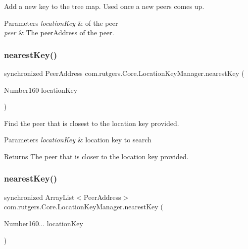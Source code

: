 Add a new key to the tree map. Used once a new peers comes up. 
\begin{DoxyParams}{Parameters}
{\em location\+Key} & of the peer \\
\hline
{\em peer} & The peer\+Address of the peer. \\
\hline
\end{DoxyParams}
\mbox{\label{classcom_1_1rutgers_1_1Core_1_1LocationKeyManager_a228d1932314bbf29b6480ffc6eff2ae6}} 
\subsubsection{\texorpdfstring{nearest\+Key()}{nearestKey()}\hspace{0.1cm}{\footnotesize\ttfamily [1/2]}}
{\footnotesize\ttfamily synchronized Peer\+Address com.\+rutgers.\+Core.\+Location\+Key\+Manager.\+nearest\+Key (\begin{DoxyParamCaption}\item[{Number160}]{location\+Key }\end{DoxyParamCaption})}

Find the peer that is closest to the location key provided. 
\begin{DoxyParams}{Parameters}
{\em location\+Key} & location key to search \\
\hline
\end{DoxyParams}
\begin{DoxyReturn}{Returns}
The peer that is closer to the location key provided. 
\end{DoxyReturn}
\mbox{\label{classcom_1_1rutgers_1_1Core_1_1LocationKeyManager_aee8ab17dac0b5ee588ffb29230c7a460}} 
\subsubsection{\texorpdfstring{nearest\+Key()}{nearestKey()}\hspace{0.1cm}{\footnotesize\ttfamily [2/2]}}
{\footnotesize\ttfamily synchronized Array\+List$<$Peer\+Address$>$ com.\+rutgers.\+Core.\+Location\+Key\+Manager.\+nearest\+Key (\begin{DoxyParamCaption}\item[{Number160...}]{location\+Key }\end{DoxyParamCaption})}

